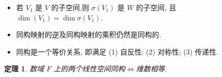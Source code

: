 \documentclass[13pt]{beamer}
\newtheorem{thm}{定理}
\def\dim{\operatorname{dim}}
\begin{document}
\begin{frame}
\begin{itemize}

\item 若 $V_{1}$ 是 $V$ 的子空间,则 $\sigma \left(V_{1}\right)$ 是 $W$ 的子空间, 且 $\dim (V_1) =\dim \sigma \left(V_{1}\right)$.

\item 同构映射的逆及同构映射的乘积仍然是同构的.

\item  同构是一个等价关系, 即满足
        (1) 自反性; 
        (2) 对称性; 
        (3) 传递性. 
\end{itemize}
\begin{thm}
数域 $F$ 上的两个线性空间同构$\Leftrightarrow$维数相等.
\end{thm}
\end{frame}
\end{document}
